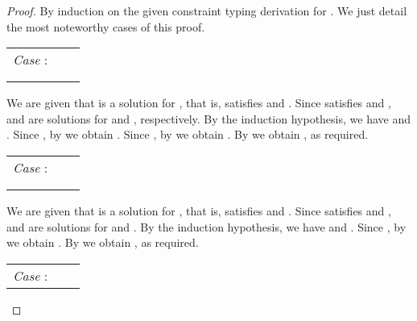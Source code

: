 \documentclass{eptcs}
\newcommand{\ih}{induction hypothesis\xspace}
\begin{document}
\begin{proof}
By induction on the given constraint typing derivation for . We just detail the most noteworthy cases of this
proof.

\begin{flushleft}
\begin{tabular}{lll}
        \textit{Case} :        & 
                                &                        \\
                                
                                &                   
                                &                                   \\
                                
                                & &        \\ 
\end{tabular}
\end{flushleft}

We are given that  is a solution for , that is,  satisfies  and
. Since  satisfies  and ,
 and  are solutions for
 and ,
respectively.
By the \ih, we have  and
. Since , by  we obtain . Since , by
 we obtain . By  we
obtain  , as required.

\begin{flushleft}
\begin{tabular}{lll}
        \textit{Case} :       & 
                                &                        \\
                                
                                &                   
                                &                                   \\
                                
                                & &  \\ 
\end{tabular}
\end{flushleft}

We are given that  is a solution for , that is,  satisfies  and
. Since  satisfies  and ,
 and  are solutions for
 and .
By the \ih, we have  and
. Since , by
 we obtain . By  we
obtain  , as required.

\begin{flushleft}
\begin{tabular}{lll}
        \textit{Case} :       & 
                                &                   \\
                                

\end{tabular}
\end{flushleft}
\end{proof}
\end{document}
